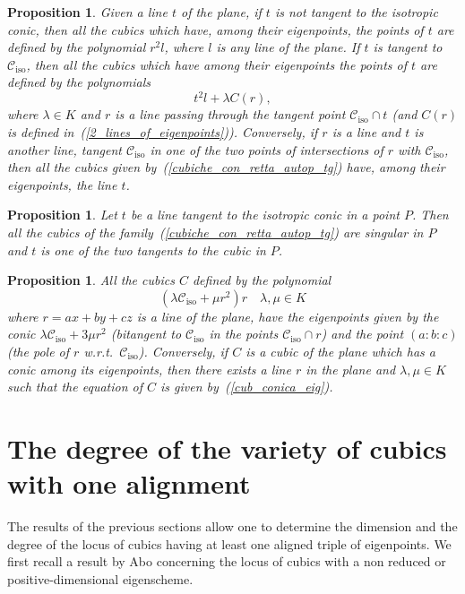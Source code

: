 \documentclass[11pt, a4paper, reqno, captions=tableheading,bibliography=totoc]{scrartcl}
\theoremstyle{plain}
\newtheorem{prop}[lemma]{Proposition}
\theoremstyle{definition}
\newcommand{\iso}{\mathcal{C}_{\mathrm{iso}}}
\begin{document}
\begin{prop}
Given a line $t$ of the plane, if $t$ is not tangent to the isotropic
conic, then all the cubics which have, among their
eigenpoints, the points of $t$ are defined by the polynomial $r^2l$,
where $l$ is any line of the plane. If $t$ is tangent to $\iso$, then
all the cubics which have among their eigenpoints the points of $t$ are
defined by the polynomials
\begin{equation}
\label{cubiche_con_retta_autop_tg}
t^2l+\lambda C(r),
\end{equation}
where $\lambda \in K$ and $r$ is a line
passing through the tangent point $\iso\cap t$ (and $C(r)$ is defined
in~(\ref{2_lines_of_eigenpoints})). Conversely, if $r$ is a line and
$t$ is another line, tangent $\iso$ in one of the two points of intersections
of $r$ with $\iso$, then all the cubics given
by~(\ref{cubiche_con_retta_autop_tg}) have, among their eigenpoints,
the line $t$.
\end{prop}


\begin{prop}
Let $t$ be a line tangent to the isotropic conic in a point $P$. Then all the
cubics of the family~(\ref{cubiche_con_retta_autop_tg}) are singular in
$P$ and $t$ is one of the two tangents to the cubic in $P$.
\end{prop}

\begin{prop} All the cubics $C$ defined by the polynomial
\begin{equation}
\label{cub_conica_eig}
(\lambda \iso + \mu r^2)r \quad \mbox{$\lambda, \mu \in K$}
\end{equation}
where $r=ax+by+cz$ is a line of the plane,
have the eigenpoints given by the conic
$\lambda \iso+3\mu r^2$ (bitangent to $\iso$ in the points $\iso \cap r$)
and the point $(a:b:c)$ (the pole of $r$
w.r.t.\ $\iso$). Conversely, if
$C$ is a cubic of the plane which has a conic among its eigenpoints,
then there exists a line $r$ in the plane and $\lambda, \mu \in K$
such that the equation of
$C$ is given by~(\ref{cub_conica_eig}).
\end{prop}


\section{The degree of the variety of cubics with one alignment}
\label{degree}

The results of the previous sections allow one to determine the dimension and the degree of the locus of cubics having
at least one aligned triple of eigenpoints. We first recall a result by Abo concerning the locus of cubics with a non reduced or positive-dimensional eigenscheme.
\end{document}
